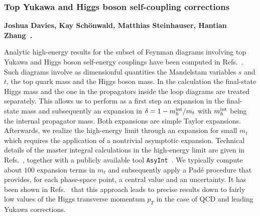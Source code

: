 \subsubsection{Top Yukawa and Higgs boson self-coupling corrections}

\label{EW:Top-Higgs_self}



\noindent \textbf{Joshua Davies, Kay Schönwald, Matthias Steinhauser, Hantian Zhang~\cite{Davies:2022ram,Davies:2025wke}.}

\noindent Analytic high-energy results for the subset of Feynman diagrams involving top Yukawa and Higgs boson self-energy couplings have been computed in Refs.~\cite{Davies:2022ram,Davies:2025wke}.  Such diagrams involve as dimensionful quantities the Mandelstam variables $s$ and $t$, the top quark mass and the Higgs boson mass.  In the calculation the final-state Higgs mass and the one in the propagators inside the loop diagrams are treated separately. This allows us to perform as a first step an expansion in the final-state mass and subsequently an expansion in $\delta = 1-m_h^{\rm int}/m_t$ with $m_h^{\rm int}$ being the internal propagator mass. Both expansions are simple Taylor expansions.
Afterwards, we realize the high-energy limit through an expansion for small $m_t$ which requires the application of a nontrivial asymptotic expansion.
%
Technical details of the master integral calculations in the high-energy limit are given in Refs.~\cite{Zhang:2024fcu,Davies:2022ram,Davies:2025wke}, together with a publicly available tool \texttt{AsyInt}~\cite{Zhang:2024fcu}.
%
We typically compute about $100$ expansion terms in $m_t$ and subsequently apply a Pad\'e procedure that provides, for each phase-space point, a central value and an uncertainty. It has been shown in Refs.~\cite{Davies:2022ram, Davies:2023vmj} that this approach leads to precise results down to fairly low values of the Higgs transverse momentum $p_T$ in the case of QCD and leading Yukawa corrections.

